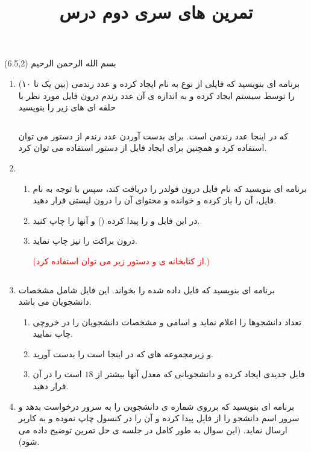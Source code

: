 \documentclass[oneside]{article}
\title{تمرین های سری دوم درس
\lr{Service Based Architecture}
}
\date{\vspace{-5ex}}
\newcommand{\inputcode}[2]{\inputminted[mathescape,%
                                                 linenos=true,%
                                                 formatcom=\small\setstretch{1}]{#1}{#2}}%
\begin{document}
\maketitle

\begin{textblock}{5}(6.5,2)\nastaliqfont
\noindent\Large
بسم الله الرحمن الرحیم
\end{textblock}

\begin{enumerate}
\item
برنامه ای بنویسید که فایلی از نوع 
به نام 
ایجاد کرده و
عدد رندمی (بین یک تا ۱۰) را توسط سیستم ایجاد کرده و به اندازه ی آن عدد رندم 
 درون فایل مورد نظر با حلقه ای 
های 
 زیر را بنویسید 
\begin{latin}\inputcode{Text}{q1.txt}\end{latin}
که در اینجا
عدد رندمی است.
برای بدست آوردن عدد رندم از دستور 
می توان استفاده کرد و همچنین
برای ایجاد فایل از دستور
استفاده می توان کرد.
\item 
\begin{enumerate}
\item
برنامه ای بنویسید که 
نام فایل درون فولدر 
را دریافت کند، سپس با توجه به نام فایل، آن را باز کرده و خوانده و محتوای آن را درون لیستی قرار دهید.
\item 
در این فایل 
و 
را 
پیدا کرده
()
 و آنها را
چاپ کنید.
\item
{}
درون 
براکت را نیز چاپ نماید.

\textcolor{red}{
(از کتابخانه ی
و دستور زیر 
می توان استفاده کرد.)
\begin{latin}\inputcode{Text}{q2.txt}\end{latin}
}
\end{enumerate}
\item 
برنامه ای بنویسید که
فایل
داده شده را بخواند.
این فایل شامل مشخصات دانشجویان می باشد. 
\begin{enumerate}
\item
 تعداد دانشجوها را اعلام نماید و 
 اسامی و مشخصات دانشجویان را در خروچی چاپ نمایید.
 \item
 و
 زیرمجموعه های 
 که در اینجا
 است را بدست آورید.
 \item
 فایل 
 جدیدی ایجاد کرده و دانشجویانی که معدل آنها بیشتر از 
 $18$
 است را در آن قرار دهید. 
\end{enumerate}
\item 
برنامه ای بنویسید که
برروی
شماره ی دانشجویی را به سرور درخواست بدهد
و سرور اسم دانشجو را 
از فایل 
پیدا کرده و آن را در کنسول چاپ نموده و
به کاربر ارسال نماید.
(این سوال به طور کامل در جلسه ی حل تمرین توضیح داده می شود).



\end{enumerate}
\end{document}
